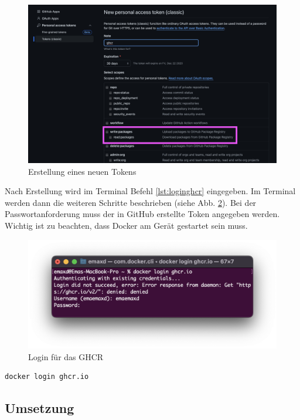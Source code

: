 \begin{figure}
    \centering
    \includegraphics[scale=0.35]{pics/newtoken.png}
    \caption{Erstellung eines neuen Tokens}
    \label{fig:implementation:githubtoken}
\end{figure}

Nach Erstellung wird im Terminal Befehl \ref{lst:loginghcr} eingegeben. 
Im Terminal werden dann die weiteren Schritte beschrieben (siehe Abb. \ref{fig:implementation:githublogin}). 
Bei der Passwortanforderung muss der in GitHub erstellte Token angegeben werden. 
Wichtig ist zu beachten, dass Docker am Gerät gestartet sein muss. 

\begin{figure}
    \centering
    \includegraphics[scale=0.5]{pics/ghcrloginterminal.png}
    \caption{Login für das GHCR}
    \label{fig:implementation:githublogin}
\end{figure}

\begin{lstlisting}[label=lst:loginghcr, language=bash, caption=GHCR Login]
docker login ghcr.io
\end{lstlisting}
\subsection{Umsetzung}

